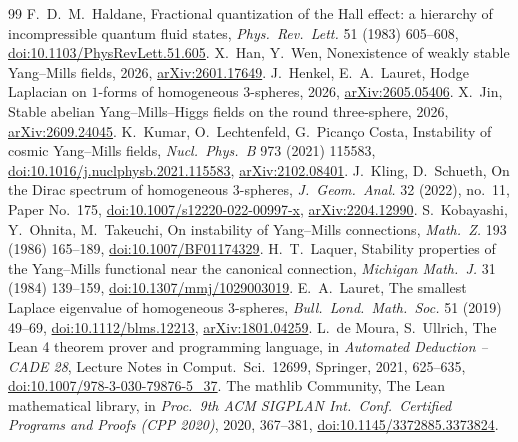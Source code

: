 \documentclass[11pt]{article}
\theoremstyle{definition}
\theoremstyle{remark}
\begin{document}
\begin{thebibliography}{99}
 F.~D.~M.~Haldane, Fractional quantization of the Hall effect: a hierarchy of incompressible quantum fluid states, \emph{Phys.\ Rev.\ Lett.} 51 (1983) 605--608, \href{https://doi.org/10.1103/PhysRevLett.51.605}{doi:10.1103/PhysRevLett.51.605}.
 X.~Han, Y.~Wen, Nonexistence of weakly stable Yang--Mills fields, 2026, \href{https://arxiv.org/abs/2601.17649}{arXiv:2601.17649}.
 J.~Henkel, E.~A.~Lauret, Hodge Laplacian on $1$-forms of homogeneous $3$-spheres, 2026, \href{https://arxiv.org/abs/2605.05406}{arXiv:2605.05406}.
 X.~Jin, Stable abelian Yang--Mills--Higgs fields on the round three-sphere, 2026, \href{https://arxiv.org/abs/2609.24045}{arXiv:2609.24045}.
 K.~Kumar, O.~Lechtenfeld, G.~Pican\c{c}o Costa, Instability of cosmic Yang--Mills fields, \emph{Nucl.\ Phys.\ B} 973 (2021) 115583, \href{https://doi.org/10.1016/j.nuclphysb.2021.115583}{doi:10.1016/j.nuclphysb.2021.115583}, \href{https://arxiv.org/abs/2102.08401}{arXiv:2102.08401}.
 J.~Kling, D.~Schueth, On the Dirac spectrum of homogeneous $3$-spheres, \emph{J.\ Geom.\ Anal.} 32 (2022), no.~11, Paper No.~175, \href{https://doi.org/10.1007/s12220-022-00997-x}{doi:10.1007/s12220-022-00997-x}, \href{https://arxiv.org/abs/2204.12990}{arXiv:2204.12990}.
 S.~Kobayashi, Y.~Ohnita, M.~Takeuchi, On instability of Yang--Mills connections, \emph{Math.\ Z.} 193 (1986) 165--189, \href{https://doi.org/10.1007/BF01174329}{doi:10.1007/BF01174329}.
 H.~T.~Laquer, Stability properties of the Yang--Mills functional near the canonical connection, \emph{Michigan Math.\ J.} 31 (1984) 139--159, \href{https://doi.org/10.1307/mmj/1029003019}{doi:10.1307/mmj/1029003019}.
 E.~A.~Lauret, The smallest Laplace eigenvalue of homogeneous $3$-spheres, \emph{Bull.\ Lond.\ Math.\ Soc.} 51 (2019) 49--69, \href{https://doi.org/10.1112/blms.12213}{doi:10.1112/blms.12213}, \href{https://arxiv.org/abs/1801.04259}{arXiv:1801.04259}.
 L.~de Moura, S.~Ullrich, The Lean 4 theorem prover and programming language, in \emph{Automated Deduction -- CADE 28}, Lecture Notes in Comput.\ Sci.\ 12699, Springer, 2021, 625--635, \href{https://doi.org/10.1007/978-3-030-79876-5_37}{doi:10.1007/978-3-030-79876-5\_37}.
 The mathlib Community, The Lean mathematical library, in \emph{Proc.\ 9th ACM SIGPLAN Int.\ Conf.\ Certified Programs and Proofs (CPP 2020)}, 2020, 367--381, \href{https://doi.org/10.1145/3372885.3373824}{doi:10.1145/3372885.3373824}.

\end{thebibliography}
\end{document}
